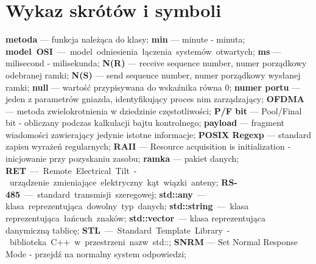 \newpage
\chapter*{Wykaz skrótów i symboli}
\noindent
\textbf{metoda} --- funkcja należąca do klasy;\newline
\textbf{min} --- minute - minuta;\newline
\textbf{model OSI} --- model odniesienia łączenia systemów otwartych;\newline
\textbf{ms} --- milisecond - milisekunda;\newline
\textbf{N(R)} --- receive sequence number, numer porządkowy odebranej ramki;\newline
\textbf{N(S)} --- send sequence number, numer porządkowy wysłanej ramki;\newline
\textbf{null} --- wartość przypisywana do wskaźnika równa 0;\newline
\textbf{numer portu} --- jeden z parametrów gniazda, identyfikujący proces nim zarządzający;\newline
\textbf{OFDMA} --- metoda zwielokrotnienia w dziedzinie częstotliwości;\newline
\textbf{P/F bit} --- Pool/Final bit - obliczany podczas kalkulacji bajtu kontrolnego;\newline
\textbf{payload} --- fragment wiadomości zawierający jedynie istotne informacje;\newline
\textbf{POSIX Regexp} --- standard zapisu wyrażeń regularnych;\newline
\textbf{RAII} --- Resource acquisition is initialization - inicjowanie przy pozyskaniu zasobu;\newline
\textbf{ramka} --- pakiet danych;\newline
\textbf{RET} --- Remote Electrical Tilt - urządzenie zmieniające elektryczny kąt wiązki anteny;\newline
\textbf{RS-485} --- standard transmisji szeregowej;\newline
\textbf{std::any} --- klasa reprezentująca dowolny typ danych;\newline
\textbf{std::string} --- klasa reprezentująca łańcuch znaków;\newline
\textbf{std::vector} --- klasa reprezentująca danymiczną tablicę;\newline
\textbf{STL} --- Standard Template Library - biblioteka C++ w przestrzeni nazw std::;\newline
\textbf{SNRM} --- Set Normal Response Mode - przejdź na normalny system odpowiedzi;\newline
